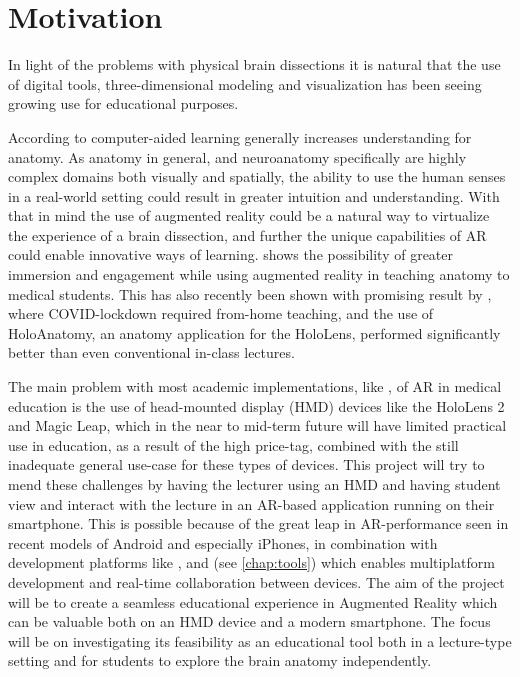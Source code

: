 \section{Motivation}

In light of the problems with physical brain dissections it is natural that the use of digital tools, three-dimensional modeling and visualization has been seeing growing use for educational purposes. 

According to \citep{Dalgarno2010} computer-aided learning generally increases understanding for anatomy. As anatomy in general, and neuroanatomy specifically are highly complex domains both visually and spatially, the ability to use the human senses in a real-world setting could result in greater intuition and understanding. With that in mind the use of augmented reality could be a natural way to virtualize the experience of a brain dissection, and further the unique capabilities of AR could enable innovative ways of learning. \citep{Moro2017} shows the possibility of greater immersion and engagement while using augmented reality in teaching anatomy to medical students. This has also recently been shown with promising result by  \citep{Wish2020}, where COVID-lockdown required from-home teaching, and the use of HoloAnatomy, an anatomy application for the HoloLens, performed significantly better than even conventional in-class lectures.

The main problem with most academic implementations, like \citep{Wish2020}, of AR in medical education is the use of head-mounted display (HMD) devices like the HoloLens 2 and Magic Leap, which in the near to mid-term future will have limited practical use in education, as a result of the high price-tag, combined with the still inadequate general use-case for these types of devices.
This project will try to mend these challenges by having the lecturer using an HMD and having student view and interact with the lecture in an AR-based application running on their smartphone. 
This is possible because of the great leap in AR-performance seen in recent models of Android and especially iPhones, in combination with development platforms like ,  and  (see \autoref{chap:tools}) which enables multiplatform development and real-time collaboration between devices. 
The aim of the project will be to create a seamless educational experience in Augmented Reality which can be valuable both on an HMD device and a modern smartphone. The focus will be on investigating its feasibility as an educational tool both in a lecture-type setting and for students to explore the brain anatomy independently. 

